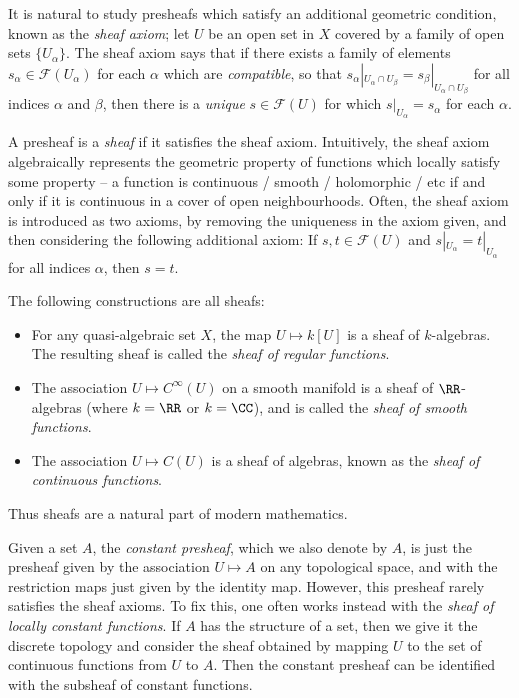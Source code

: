 It is natural to study presheafs which satisfy an additional geometric condition, known as the \emph{sheaf axiom}; let $U$ be an open set in $X$ covered by a family of open sets $\{ U_\alpha \}$. The sheaf axiom says that if there exists a family of elements $s_\alpha \in \mathcal{F}(U_\alpha)$ for each $\alpha$ which are {\it compatible}, so that $s_\alpha|_{U_\alpha \cap U_\beta} = s_\beta|_{U_\alpha \cap U_\beta}$ for all indices $\alpha$ and $\beta$, then there is a \emph{unique} $s \in \mathcal{F}(U)$ for which $s|_{U_\alpha} = s_\alpha$ for each $\alpha$.

A presheaf is a \emph{sheaf} if it satisfies the sheaf axiom. Intuitively, the sheaf axiom algebraically represents the geometric property of functions which locally satisfy some property -- a function is continuous / smooth / holomorphic / etc if and only if it is continuous in a cover of open neighbourhoods. Often, the sheaf axiom is introduced as two axioms, by removing the uniqueness in the axiom given, and then considering the following additional axiom: If $s,t \in \mathcal{F}(U)$ and $s|_{U_\alpha} = t|_{U_\alpha}$ for all indices $\alpha$, then $s = t$.

\begin{example}
    The following constructions are all sheafs:
    \begin{itemize}
        \item For any quasi-algebraic set $X$, the map $U \mapsto k[U]$ is a sheaf of $k$-algebras. The resulting sheaf is called the \emph{sheaf of regular functions}.
        \item The association $U \mapsto C^\infty(U)$ on a smooth manifold is a sheaf of $\RR$-algebras (where $k = \RR$ or $k = \CC$), and is called the \emph{sheaf of smooth functions}.
        \item The association $U \mapsto C(U)$ is a sheaf of algebras, known as the \emph{sheaf of continuous functions}.
    \end{itemize}
    Thus sheafs are a natural part of modern mathematics.
\end{example}

\begin{example}
    Given a set $A$, the \emph{constant presheaf}, which we also denote by $A$, is just the presheaf given by the association $U \mapsto A$ on any topological space, and with the restriction maps just given by the identity map. However, this presheaf rarely satisfies the sheaf axioms. To fix this, one often works instead with the \emph{sheaf of locally constant functions}. If $A$ has the structure of a set, then we give it the discrete topology and consider the sheaf obtained by mapping $U$ to the set of continuous functions from $U$ to $A$. Then the constant presheaf can be identified with the subsheaf of constant functions.
\end{example}

